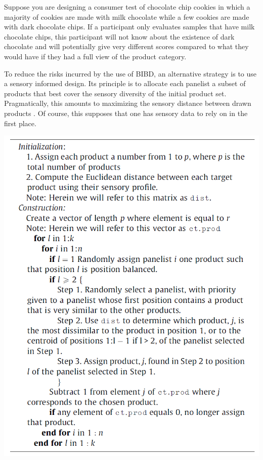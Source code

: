 \documentclass[
]{krantz}
\begin{document}
Suppose you are designing a consumer test of chocolate chip cookies in which a majority of cookies are made with milk chocolate while a few cookies are made with dark chocolate chips. If a participant only evaluates samples that have milk chocolate chips, this participant will not know about the existence of dark chocolate and will potentially give very different scores compared to what they would have if they had a full view of the product category.

To reduce the risks incurred by the use of BIBD, an alternative strategy is to use a sensory informed design. Its principle is to allocate each panelist a subset of products that best cover the sensory diversity of the initial product set. Pragmatically, this amounts to maximizing the sensory distance between drawn products \citep{Franczak2015}. Of course, this supposes that one has sensory data to rely on in the first place.

\begin{center}\includegraphics[width=10.57in]{images/sensory_doe} \end{center}
\end{document}
